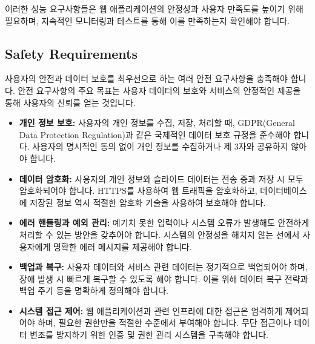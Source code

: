 \documentclass[a4paper, 12pt]{article}
\begin{document}
이러한 성능 요구사항들은 웹 애플리케이션의 안정성과 사용자 만족도를 높이기 위해 필요하며, 지속적인 모니터링과 테스트를 통해 이를 만족하는지 확인해야 합니다.

\subsection{Safety Requirements}

사용자의 안전과 데이터 보호를 최우선으로 하는 여러 안전 요구사항을 충족해야 합니다. 안전 요구사항의 주요 목표는 사용자 데이터의 보호와 서비스의 안정적인 제공을 통해 사용자의 신뢰를 얻는 것입니다.

\begin{itemize}
    \item \textbf{개인 정보 보호:} 사용자의 개인 정보를 수집, 저장, 처리할 때, GDPR(General Data Protection Regulation)과 같은 국제적인 데이터 보호 규정을 준수해야 합니다. 사용자의 명시적인 동의 없이 개인 정보를 수집하거나 제 3자와 공유하지 않아야 합니다.
    
    \item \textbf{데이터 암호화:} 사용자의 개인 정보와 슬라이드 데이터는 전송 중과 저장 시 모두 암호화되어야 합니다. HTTPS를 사용하여 웹 트래픽을 암호화하고, 데이터베이스에 저장된 정보 역시 적절한 암호화 기술을 사용하여 보호해야 합니다.
    
    \item \textbf{에러 핸들링과 예외 관리:} 예기치 못한 입력이나 시스템 오류가 발생해도 안전하게 처리할 수 있는 방안을 갖추어야 합니다. 시스템의 안정성을 해치지 않는 선에서 사용자에게 명확한 에러 메시지를 제공해야 합니다.
    
    \item \textbf{백업과 복구:} 사용자 데이터와 서비스 관련 데이터는 정기적으로 백업되어야 하며, 장애 발생 시 빠르게 복구할 수 있도록 해야 합니다. 이를 위해 데이터 복구 전략과 백업 주기 등을 명확하게 정의해야 합니다.
    
    \item \textbf{시스템 접근 제어:} 웹 애플리케이션과 관련 인프라에 대한 접근은 엄격하게 제어되어야 하며, 필요한 권한만을 적절한 수준에서 부여해야 합니다. 무단 접근이나 데이터 변조를 방지하기 위한 인증 및 권한 관리 시스템을 구축해야 합니다.
\end{itemize}
\end{document}
